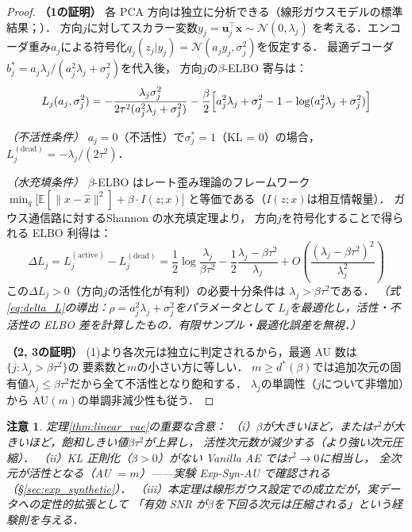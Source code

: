 \documentclass[11pt,a4paper]{jsarticle}
\newtheorem{remark}{注意}
\begin{document}
\begin{proof}
\textbf{（1の証明）}
各 PCA 方向は独立に分析できる（線形ガウスモデルの標準結果；\cite{tippingbishop1999ppca}）．
方向$j$に対してスカラー変数$y_j = \boldsymbol{u}_j^\top \boldsymbol{x} \sim \mathcal{N}(0, \lambda_j)$
を考える．エンコーダ重み$a_j$による符号化$q_j(z_j|y_j) = \mathcal{N}(a_j y_j, \sigma_j^2)$を仮定する．
最適デコーダ$b_j^* = a_j\lambda_j/(a_j^2\lambda_j + \sigma_j^2)$を代入後，
方向$j$の$\beta$-ELBO 寄与は：
\begin{equation}
  L_j(a_j, \sigma_j^2)
  = -\frac{\lambda_j \sigma_j^2}{2\tau^2(a_j^2\lambda_j + \sigma_j^2)}
    - \frac{\beta}{2}\Bigl[a_j^2\lambda_j + \sigma_j^2 - 1 - \log(a_j^2\lambda_j + \sigma_j^2)\Bigr]
  \label{eq:elbo_j}
\end{equation}

\textit{（不活性条件）}
$a_j = 0$（不活性）で$\sigma_j^* = 1$（KL = 0）の場合，$L_j^{(\mathrm{dead})} = -\lambda_j/(2\tau^2)$．

\textit{（水充填条件）}
$\beta$-ELBO はレート歪み理論\cite{cover2006elements}のフレームワーク
$\min_{q}\bigl[\mathbb{E}[\|x - \hat{x}\|^2] + \beta \cdot I(z;x)\bigr]$
と等価である（$I(z;x)$は相互情報量）．
ガウス通信路に対するShannon の水充填定理\cite{cover2006elements}より，
方向$j$を符号化することで得られる ELBO 利得は：
\begin{equation}
  \Delta L_j = L_j^{(\mathrm{active})} - L_j^{(\mathrm{dead})}
  = \frac{1}{2}\log\frac{\lambda_j}{\beta\tau^2} - \frac{1}{2}\frac{\lambda_j - \beta\tau^2}{\lambda_j} + O\!\left(\frac{(\lambda_j - \beta\tau^2)^2}{\lambda_j^2}\right)
  \label{eq:delta_L}
\end{equation}
この$\Delta L_j > 0$（方向$j$の活性化が有利）の必要十分条件は
$\lambda_j > \beta\tau^2$である．
\textit{（式\eqref{eq:delta_L}の導出：$\rho = a_j^2\lambda_j + \sigma_j^2$をパラメータとして
$L_j$を最適化し，活性・不活性の ELBO 差を計算したもの．有限サンプル・最適化誤差を無視．）}

\textbf{（2, 3の証明）}
(1)より各次元は独立に判定されるから，最適 AU 数は$\{j : \lambda_j > \beta\tau^2\}$の
要素数と$m$の小さい方に等しい．
$m \geq d^*(\beta)$では追加次元の固有値$\lambda_j \leq \beta\tau^2$だから全て不活性となり飽和する．
$\lambda_j$の単調性（$j$について非増加）から AU$(m)$の単調非減少性も従う．
\end{proof}

\begin{remark}
定理\ref{thm:linear_vae}の重要な含意：
（i）$\beta$が大きいほど，または$\tau^2$が大きいほど，飽和しきい値$\beta\tau^2$が上昇し，
活性次元数が減少する（より強い次元圧縮）．
（ii）KL 正則化（$\beta > 0$）がない Vanilla AE では$\tau^2 \to 0$に相当し，
全次元が活性となる（AU $= m$）——実験 Exp-Syn-AU で確認される（§\ref{sec:exp_synthetic}）．
（iii）本定理は線形ガウス設定での成立だが，実データへの定性的拡張として
「有効 SNR が$\beta$を下回る次元は圧縮される」という経験則を与える．
\end{remark}
\end{document}
